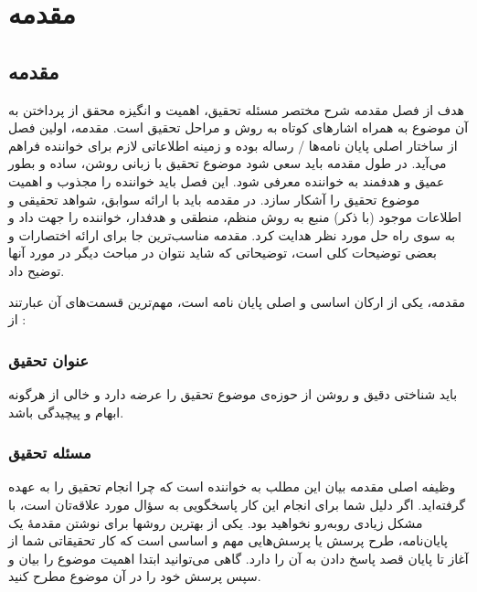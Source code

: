 \mainchapterstyle %
\chapter{مقدمه} %
\pagestyle{mainheader} %


\section{مقدمه}
هدف از فصل مقدمه شرح مختصر مسئله تحقیق، اهمیت و انگیزه محقق از پرداختن به آن موضوع به
همراه اشارهای کوتاه به روش و مراحل تحقیق است. مقدمه، اولین فصل از ساختار اصلی پایان نامه‌ها / رساله
بوده و زمینه اطلاعاتی لازم برای خواننده فراهم می‌آید. در طول مقدمه باید سعی شود موضوع تحقیق با
زبانی روشن، ساده و بطور عمیق و هدفمند به خواننده معرفی شود. این فصل باید خواننده را مجذوب و
اهمیت موضوع تحقیق را آشکار سازد. در مقدمه باید با ارائه سوابق، شواهد تحقیقی و اطلاعات موجود (با ذکر)
منبع به روش منظم، منطقی و هدفدار، خواننده را جهت داد و به سوی راه حل مورد نظر هدایت کرد.
مقدمه مناسب‌ترین جا برای ارائه اختصارات و بعضی توضیحات کلی است، توضیحاتی که شاید نتوان در
مباحث دیگر در مورد آنها توضیح داد.

مقدمه، یکی از ارکان اساسی و اصلی پایان نامه است، مهم‌ترین قسمت‌های آن عبارتند از :

\subsection{عنوان تحقيق}
باید شناختی دقیق و روشن از حوزه‌ی موضوع تحقیق را عرضه دارد و خالی از هرگونه ابهام و پیچیدگی
باشد.

\subsection{مسئله تحقیق}  
وظیفه اصلی مقدمه بیان این مطلب به خواننده است که چرا انجام تحقیق را به عهده گرفته‌اید. اگر دلیل
شما برای انجام این کار پاسخگویی به سؤال مورد علاقه‌تان است، با مشکل زیادی روبه‌رو نخواهید بود. یکی از
بهترین روشها برای نوشتن مقدمۀ یک پایان‌نامه، طرح پرسش یا پرسش‌هایی مهم و اساسی است که کار
تحقیقاتی شما از آغاز تا پایان قصد پاسخ دادن به آن را دارد. گاهی می‌توانید ابتدا اهمیت موضوع را بیان و
سپس پرسش خود را در آن موضوع مطرح کنید.

